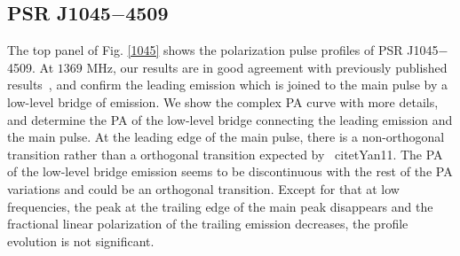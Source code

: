 \documentclass[useAMS,usenatbib]{mn2e}
\begin{document}


%
\subsection{PSR J1045$-$4509}

The top panel of Fig. \ref{1045} shows the polarization pulse profiles of 
PSR J1045$-$4509.
%
At $1369$ MHz, our results are in good agreement with previously published
results~\citep{Yan11}, and confirm the leading emission which is joined to 
the main pulse by a low-level bridge of emission.
%
We show the complex PA curve with more details, and determine the PA of the 
low-level bridge connecting the leading emission and the main pulse.
%
At the leading edge of the main pulse, there is a non-orthogonal transition 
rather than a orthogonal transition expected by ~citet{Yan11}.
%
The PA of the low-level bridge emission seems to be discontinuous with 
the rest of the PA variations and could be an orthogonal transition.
%
Except for that at low frequencies, the peak at the trailing edge of the 
main peak disappears and the fractional linear polarization of the trailing 
emission decreases, the profile evolution is not significant.

\end{document}
